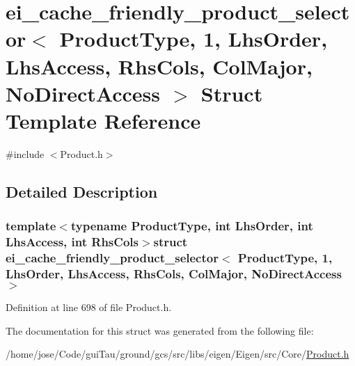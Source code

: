 \hypertarget{structei__cache__friendly__product__selector_3_01_product_type_00_011_00_01_lhs_order_00_01_lhs_c50e21f186f26eeea516969719467f1e}{\section{ei\-\_\-cache\-\_\-friendly\-\_\-product\-\_\-selector$<$ Product\-Type, 1, Lhs\-Order, Lhs\-Access, Rhs\-Cols, Col\-Major, No\-Direct\-Access $>$ Struct Template Reference}
\label{structei__cache__friendly__product__selector_3_01_product_type_00_011_00_01_lhs_order_00_01_lhs_c50e21f186f26eeea516969719467f1e}
}


{\ttfamily \#include $<$Product.\-h$>$}



\subsection{Detailed Description}
\subsubsection*{template$<$typename Product\-Type, int Lhs\-Order, int Lhs\-Access, int Rhs\-Cols$>$struct ei\-\_\-cache\-\_\-friendly\-\_\-product\-\_\-selector$<$ Product\-Type, 1, Lhs\-Order, Lhs\-Access, Rhs\-Cols, Col\-Major, No\-Direct\-Access $>$}



Definition at line 698 of file Product.\-h.



The documentation for this struct was generated from the following file\-:\begin{DoxyCompactItemize}
\item 
/home/jose/\-Code/gui\-Tau/ground/gcs/src/libs/eigen/\-Eigen/src/\-Core/\hyperlink{_product_8h}{Product.\-h}\end{DoxyCompactItemize}
